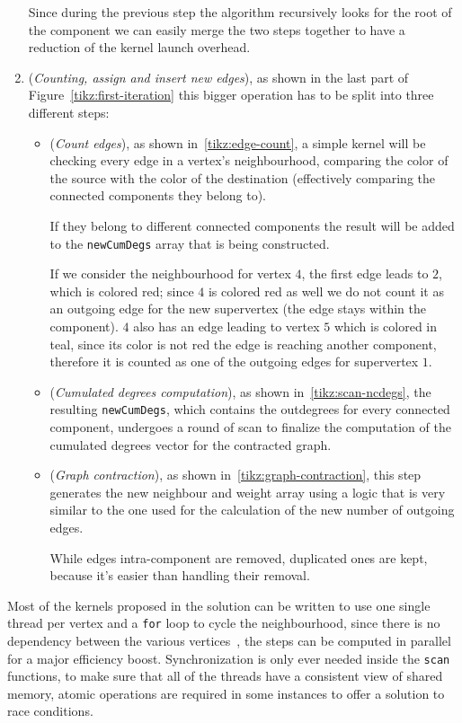 \documentclass[a4paper,10pt]{article}
\begin{document}
\begin{enumerate}
		Since during the previous step the algorithm recursively looks for the root of the
		component we can easily merge the two steps together to have a reduction of the
		kernel launch overhead.
	\item\label{item:graph-contraction} (\textit{Counting, assign and insert new edges}), as shown in the last part of Figure~\ref{tikz:first-iteration} this bigger operation has to be split into three different steps:
	\begin{itemize}
		\item\label{item:count-edges} (\textit{Count edges}), as shown in~\ref{tikz:edge-count}, a simple kernel will be checking every edge in a vertex's neighbourhood, comparing the color of the source with the color of the destination (effectively comparing the connected components they belong to).
		
		If they belong to different connected components the result will be added to the \texttt{newCumDegs} array that is being constructed.
		
			If we consider the neighbourhood for vertex $4$, the first edge leads to
			$2$, which is colored red; since $4$ is colored red as well we do not count
			it as an outgoing edge for the new supervertex (the edge stays within the
			component). $4$ also has an edge leading to vertex $5$ which is colored in
			teal, since its color is not red the edge is reaching another component,
			therefore it is counted as one of the outgoing edges for supervertex $1$.
		\item\label{item:scan-ncd} (\textit{Cumulated degrees computation}), as shown in~\ref{tikz:scan-ncdegs}, the resulting \texttt{newCumDegs}, which contains the outdegrees for every connected component, undergoes a round of scan to finalize the computation of the cumulated degrees vector for the contracted graph.
		\item\label{item:graph-regen} (\textit{Graph contraction}), as shown in~\ref{tikz:graph-contraction}, this step generates the new neighbour and weight array using a logic that is very similar to the one used for the calculation of the new number of outgoing edges.
		
		While edges intra-component are removed, duplicated ones are kept, because it's easier than handling their removal.
	\end{itemize}
\end{enumerate}
Most of the kernels proposed in the solution can be written to use one single thread per vertex and a \texttt{for} loop to cycle the neighbourhood, since there is no dependency between the various vertices~\cite{generic-he-boruvka}, the steps can be computed in parallel for a major efficiency boost. Synchronization is only ever needed inside the \texttt{scan} functions, to make sure that all of the threads have a consistent view of shared memory, atomic operations are required in some instances to offer a solution to race conditions.
\end{document}
